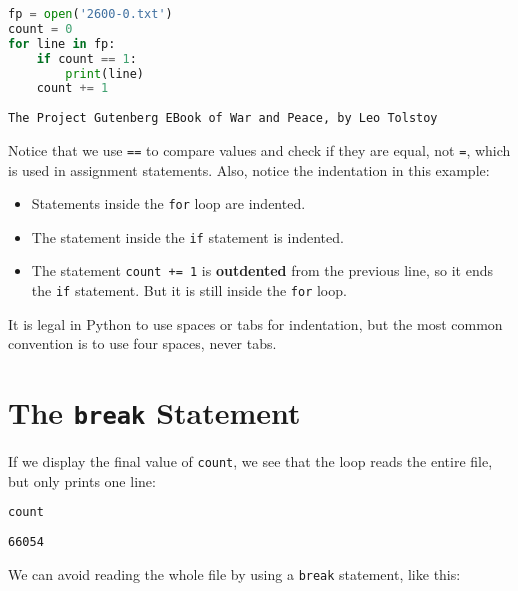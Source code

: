 \begin{lstlisting}[language=Python,style=source]
fp = open('2600-0.txt')
count = 0
for line in fp:
    if count == 1:
        print(line)
    count += 1
\end{lstlisting}

\begin{lstlisting}[style=output]
The Project Gutenberg EBook of War and Peace, by Leo Tolstoy
\end{lstlisting}

Notice that we use \passthrough{\lstinline!==!} to compare values and
check if they are equal, not \passthrough{\lstinline!=!}, which is used
in assignment statements. Also, notice the indentation in this example:

\begin{itemize}
\item
  Statements inside the \passthrough{\lstinline!for!} loop are indented.
\item
  The statement inside the \passthrough{\lstinline!if!} statement is
  indented.
\item
  The statement \passthrough{\lstinline!count += 1!} is
  \textbf{outdented} from the previous line, so it ends the
  \passthrough{\lstinline!if!} statement. But it is still inside the
  \passthrough{\lstinline!for!} loop.
\end{itemize}

It is legal in Python to use spaces or tabs for indentation, but the
most common convention is to use four spaces, never tabs.

\section{\texorpdfstring{The \texttt{break}
Statement}{The break Statement}}\label{the-break-statement}

If we display the final value of \passthrough{\lstinline!count!}, we see
that the loop reads the entire file, but only prints one line:

\begin{lstlisting}[language=Python,style=source]
count
\end{lstlisting}

\begin{lstlisting}[style=output]
66054
\end{lstlisting}

We can avoid reading the whole file by using a
\passthrough{\lstinline!break!} statement, like this:


